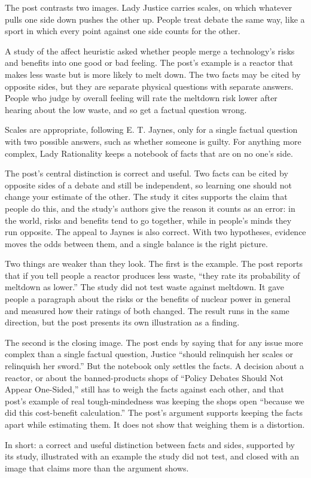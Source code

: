 \begin{afterword}
\summaryhead

The post contrasts two images. Lady Justice carries scales, on which whatever pulls one side down pushes the other up. People treat debate the same way, like a sport in which every point against one side counts for the other.

A study of the affect heuristic asked whether people merge a technology's risks and benefits into one good or bad feeling. The post's example is a reactor that makes less waste but is more likely to melt down. The two facts may be cited by opposite sides, but they are separate physical questions with separate answers. People who judge by overall feeling will rate the meltdown risk lower after hearing about the low waste, and so get a factual question wrong.

Scales are appropriate, following E. T. Jaynes, only for a single factual question with two possible answers, such as whether someone is guilty. For anything more complex, Lady Rationality keeps a notebook of facts that are on no one's side.

\responsehead

The post's central distinction is correct and useful. Two facts can be cited by opposite sides of a debate and still be independent, so learning one should not change your estimate of the other. The study it cites supports the claim that people do this, and the study's authors give the reason it counts as an error: in the world, risks and benefits tend to go together, while in people's minds they run opposite. The appeal to Jaynes is also correct. With two hypotheses, evidence moves the odds between them, and a single balance is the right picture.

Two things are weaker than they look. The first is the example. The post reports that if you tell people a reactor produces less waste, ``they rate its probability of meltdown as lower.'' The study did not test waste against meltdown. It gave people a paragraph about the risks or the benefits of nuclear power in general and measured how their ratings of both changed. The result runs in the same direction, but the post presents its own illustration as a finding.

The second is the closing image. The post ends by saying that for any issue more complex than a single factual question, Justice ``should relinquish her scales or relinquish her sword.'' But the notebook only settles the facts. A decision about a reactor, or about the banned-products shops of ``Policy Debates Should Not Appear One-Sided,'' still has to weigh the facts against each other, and that post's example of real tough-mindedness was keeping the shops open ``because we did this cost-benefit calculation.'' The post's argument supports keeping the facts apart while estimating them. It does not show that weighing them is a distortion.

In short: a correct and useful distinction between facts and sides, supported by its study, illustrated with an example the study did not test, and closed with an image that claims more than the argument shows.
\end{afterword}
